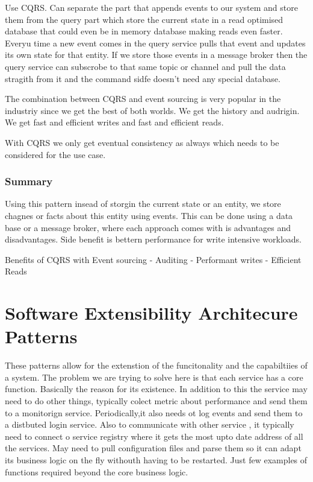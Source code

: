 \documentclass[a4paper, 11pt]{book}
\begin{document}
{    Use CQRS.
    Can separate the part that appends events to our system and store them from the query part which store the current state in a read optimised database that could even be in memory database making reads even faster.
    Everyu time a new event comes in the query service pulls that event and updates its own state for that entity.
    If we store those events in a message broker then the query service can subscrobe to that same topic or channel and pull the data stragith from it and the command sidfe doesn't need any special database.

    The combination between CQRS and event sourcing is very popular in the industriy since we get the best of both worlds.
    We get the history and audrigin.
    We get fast and efficient writes and fast and efficient reads.

    With CQRS we only get eventual consistency as always which needs to be considered for the use case.

    \subsubsection{Summary}
    Using this pattern insead of storgin the current state or an entity, we store chagnes or facts about this entity using events.
    This can be done using a data base or a message broker, where each approach comes with is advantages and disadvantages.
    Side benefit is bettern performance for write intensive workloads.

    Benefits of CQRS with Event sourcing
    - Auditing
    - Performant writes
    - Efficient Reads


    \section{Software Extensibility Architecure Patterns}

    These patterns allow for the extenstion of the funcitonality and the capabiltiies of a system.
    The problem we are trying to solve here is that each service has a core function.
    Basically the reason for its existence.
    In addition to this the service may need to do other things, typically colect metric about performance and send them to a monitorign service.
    Periodically,it also needs ot log events and send them to a distbuted login service.
    Also to communicate with other service , it typically need to connect o service registry where it gets the most upto date address of all the services.
    May need to pull configuration files and parse them so it can adapt its business logic on the fly withouth having to be restarted.
    Just few examples of functions required beyond the core business logic.

}
\end{document}
